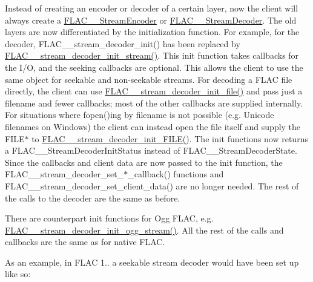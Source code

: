 Instead of creating an encoder or decoder of a certain layer, now the client will always create a \hyperlink{struct_f_l_a_c_____stream_encoder}{F\+L\+A\+C\+\_\+\+\_\+\+Stream\+Encoder} or \hyperlink{struct_f_l_a_c_____stream_decoder}{F\+L\+A\+C\+\_\+\+\_\+\+Stream\+Decoder}. The old layers are now differentiated by the initialization function. For example, for the decoder, F\+L\+A\+C\+\_\+\+\_\+stream\+\_\+decoder\+\_\+init() has been replaced by \hyperlink{group__flac__stream__decoder_ga32c28a56a2bdfa2333edbd3d991894d7}{F\+L\+A\+C\+\_\+\+\_\+stream\+\_\+decoder\+\_\+init\+\_\+stream()}. This init function takes callbacks for the I/O, and the seeking callbacks are optional. This allows the client to use the same object for seekable and non-\/seekable streams. For decoding a F\+L\+AC file directly, the client can use \hyperlink{group__flac__stream__decoder_ga1692108a97012d1c5f79baf7df012c33}{F\+L\+A\+C\+\_\+\+\_\+stream\+\_\+decoder\+\_\+init\+\_\+file()} and pass just a filename and fewer callbacks; most of the other callbacks are supplied internally. For situations where fopen()ing by filename is not possible (e.\+g. Unicode filenames on Windows) the client can instead open the file itself and supply the F\+I\+L\+E$\ast$ to \hyperlink{group__flac__stream__decoder_ga38f9eb46bf112af205f86b4cbac9980c}{F\+L\+A\+C\+\_\+\+\_\+stream\+\_\+decoder\+\_\+init\+\_\+\+F\+I\+L\+E()}. The init functions now returns a F\+L\+A\+C\+\_\+\+\_\+\+Stream\+Decoder\+Init\+Status instead of F\+L\+A\+C\+\_\+\+\_\+\+Stream\+Decoder\+State. Since the callbacks and client data are now passed to the init function, the F\+L\+A\+C\+\_\+\+\_\+stream\+\_\+decoder\+\_\+set\+\_\+$\ast$\+\_\+callback() functions and F\+L\+A\+C\+\_\+\+\_\+stream\+\_\+decoder\+\_\+set\+\_\+client\+\_\+data() are no longer needed. The rest of the calls to the decoder are the same as before.

There are counterpart init functions for Ogg F\+L\+AC, e.\+g. \hyperlink{group__flac__stream__decoder_ga78bf285b54e5aaee73a214c108683a72}{F\+L\+A\+C\+\_\+\+\_\+stream\+\_\+decoder\+\_\+init\+\_\+ogg\+\_\+stream()}. All the rest of the calls and callbacks are the same as for native F\+L\+AC.

As an example, in F\+L\+AC 1.. a seekable stream decoder would have been set up like so\+:


